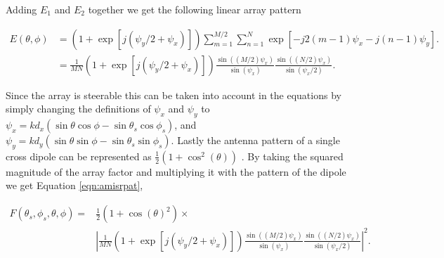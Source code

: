 \noindent Adding $E_1$ and $E_2$ together we get the following linear array pattern

\begin{equation} \label{eq1}
\begin{split}
E(\theta,\phi) &= \displaystyle  \left(1+ \exp\left[j(\psi_y/2 + \psi_x)\right]\right)\sum_{m=1}^{M/2}\sum_{n=1}^{N}  \exp\left[-j2\left(m-1\right) \psi_x -j\left(n-1\right) \psi_y\right].\\
& = \frac{1}{MN} \left(1+ \exp\left[j(\psi_y/2 + \psi_x)\right]\right)\frac{\sin((M/2) \psi_x)}{\sin(\psi_x)} \frac{\sin((N/2) \psi_x)}{\sin(\psi_x/2)}.
\end{split}
\end{equation}

Since the array is steerable this can be taken into account in the equations by simply changing the definitions of $\psi_x $ and $\psi_y$ to $\psi_x = k d_x(\sin\theta\cos\phi-\sin\theta_s\cos\phi_s)$, and $\psi_y = k d_y(\sin\theta\sin\phi-\sin\theta_s\sin\phi_s)$. Lastly the antenna pattern of a single cross dipole can be represented as $ \frac{1}{2}(1+\cos^2(\theta))$ \citep{Balanis:2005:ATA:1208379}. By taking the squared magnitude of the array factor and multiplying it with the pattern of the dipole we get Equation \ref{eqn:amisrpat},

\begin{equation}
\label{eqn:amisrpatfinal}
\begin{split}
F(\theta_s,\phi_s,\theta,\phi) =& \frac{1}{2}(1+\cos(\theta)^2) \times \\& \left| \frac{1}{MN} \left(1+ \exp\left[j(\psi_y/2 + \psi_x)\right]\right)\frac{\sin((M/2) \psi_x)}{\sin(\psi_x)} \frac{\sin((N/2) \psi_x)}{\sin(\psi_x/2)}\right|^2.
\end{split}
\end{equation}